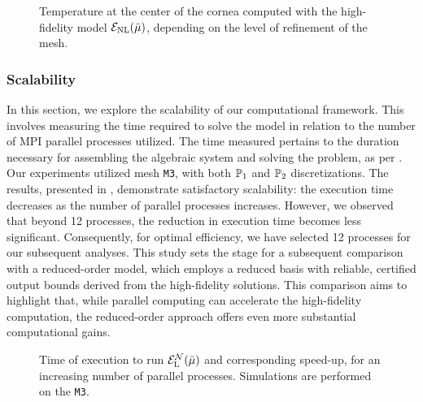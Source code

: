 \begin{figure}
    \centering
    
    \caption{Temperature at the center of the cornea computed with the high-fidelity model $\Em_\text{NL}(\bar{\mu})$, depending on the level of refinement of the mesh.}
    \label{fig:conv-output}
\end{figure}




\subsubsection{Scalability}

In this section, we explore the scalability of our computational framework.
This involves measuring the time required to solve the model in relation to the number of MPI parallel processes utilized.
The time measured pertains to the duration necessary for assembling the algebraic system and solving the problem, as per .
Our experiments utilized mesh \texttt{M3}, with both $\P_1$ and  $\P_2$ discretizations.
The results, presented in , demonstrate satisfactory scalability:
the execution time decreases as the number of parallel processes increases.
However, we observed that beyond 12 processes, the reduction in execution time becomes less significant.
Consequently, for optimal efficiency, we have selected 12 processes for our subsequent analyses.
This study sets the stage for a subsequent comparison with a reduced-order model, which employs a reduced basis with reliable, certified output bounds derived from the high-fidelity solutions.
This comparison aims to highlight that, while parallel computing can accelerate the high-fidelity computation, the reduced-order approach offers even more substantial computational gains.



\begin{figure}
    \centering
    \def\scl{0.95}
    
    
    \caption{Time of execution to run $\Em_\text{L}^\N(\bar{\mu})$ and corresponding speed-up, for an increasing number of parallel processes.
    Simulations are performed on the \texttt{M3}.}
    \label{fig:scalability}
\end{figure}


